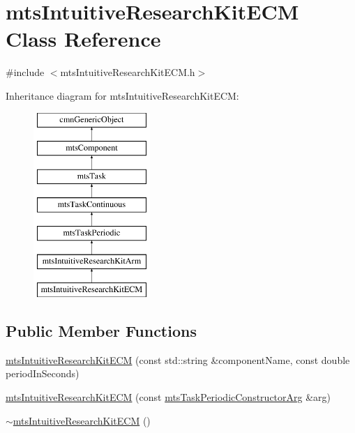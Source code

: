 \hypertarget{classmts_intuitive_research_kit_e_c_m}{\section{mts\-Intuitive\-Research\-Kit\-E\-C\-M Class Reference}
\label{classmts_intuitive_research_kit_e_c_m}
}


{\ttfamily \#include $<$mts\-Intuitive\-Research\-Kit\-E\-C\-M.\-h$>$}

Inheritance diagram for mts\-Intuitive\-Research\-Kit\-E\-C\-M\-:\begin{figure}[H]
\begin{center}
\leavevmode
\includegraphics[height=7.000000cm]{da/db3/classmts_intuitive_research_kit_e_c_m}
\end{center}
\end{figure}
\subsection*{Public Member Functions}
\begin{DoxyCompactItemize}
\item 
\hyperlink{classmts_intuitive_research_kit_e_c_m_a0c5ed41167c02448d560e8536f24f29f}{mts\-Intuitive\-Research\-Kit\-E\-C\-M} (const std\-::string \&component\-Name, const double period\-In\-Seconds)
\item 
\hyperlink{classmts_intuitive_research_kit_e_c_m_a3d4a1e5438c623e559c9d43b4d6c0a27}{mts\-Intuitive\-Research\-Kit\-E\-C\-M} (const \hyperlink{classmts_task_periodic_constructor_arg}{mts\-Task\-Periodic\-Constructor\-Arg} \&arg)
\item 
\hyperlink{classmts_intuitive_research_kit_e_c_m_a756440f373892c2b1dac2ba9f5178c97}{$\sim$mts\-Intuitive\-Research\-Kit\-E\-C\-M} ()
\end{DoxyCompactItemize}
